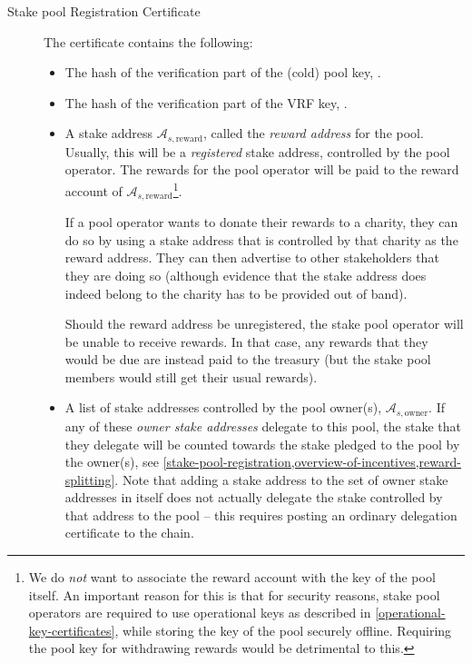 \documentclass[11pt,a4paper,dvipsnames,twosided]{article}
\begin{document}
\begin{description}
\item[Stake pool Registration Certificate]
The certificate contains the following:

\begin{itemize}
\item
  The hash of the verification part of the (cold) pool key, .

\item
  The hash of the verification part of the VRF key, .

\item
  A stake address \(\mathcal{A}_{s,\text{reward}}\), called the \emph{reward
    address} for the pool. Usually, this will be a \emph{registered} stake
  address, controlled by the pool operator. The rewards for the pool operator
  will be paid to the reward account of
  \(\mathcal{A}_{s,\text{reward}}\)\footnote{We do \emph{not} want to associate
    the reward account with the key of the pool itself. An important reason for
    this is that for security reasons, stake pool operators are required to use
    operational keys as described in \cref{operational-key-certificates}, while
    storing the key of the pool securely offline. Requiring the pool key for
    withdrawing rewards would be detrimental to this.}.

  If a pool operator wants to donate their rewards to a charity, they can do so
  by using a stake address that is controlled by that charity as the reward
  address. They can then advertise to other stakeholders that they are doing so
  (although evidence that the stake address does indeed belong to the charity
  has to be provided out of band).

  Should the reward address be unregistered, the stake pool operator will be
  unable to receive rewards. In that case, any rewards that they would be due
  are instead paid to the treasury (but the stake pool members would still get
  their usual rewards).

\item
  A list of stake addresses controlled by the pool owner(s),
  \(\mathcal{A}_{s,\text{owner}}\). If any of these \emph{owner stake addresses}
  delegate to this pool, the stake that they delegate will be counted towards
  the stake pledged to the pool by the owner(s), see
  \cref{stake-pool-registration,overview-of-incentives,reward-splitting}. Note
  that adding a stake address to the set of owner stake addresses in itself does
  not actually delegate the stake controlled by that address to the pool -- this
  requires posting an ordinary delegation certificate to the chain.


\end{itemize}
\end{description}
\end{document}
